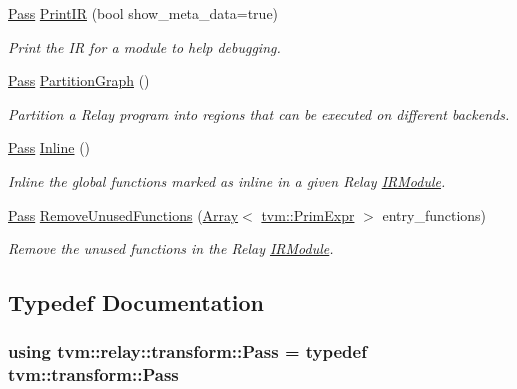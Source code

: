 \begin{DoxyCompactItemize}
\hyperlink{namespacetvm_1_1relay_1_1transform_afa666ade112e9955059095d695238a9a}{Pass} \hyperlink{namespacetvm_1_1relay_1_1transform_a065b5d8be6fd8dbfcef44dfa48adeb29}{Print\+IR} (bool show\+\_\+meta\+\_\+data=true)
\begin{DoxyCompactList}\small\item\em Print the IR for a module to help debugging. \end{DoxyCompactList}\item 
\hyperlink{namespacetvm_1_1relay_1_1transform_afa666ade112e9955059095d695238a9a}{Pass} \hyperlink{namespacetvm_1_1relay_1_1transform_aac0bfdaf6d09b360602243c81abe05a1}{Partition\+Graph} ()
\begin{DoxyCompactList}\small\item\em Partition a Relay program into regions that can be executed on different backends. \end{DoxyCompactList}\item 
\hyperlink{namespacetvm_1_1relay_1_1transform_afa666ade112e9955059095d695238a9a}{Pass} \hyperlink{namespacetvm_1_1relay_1_1transform_aba5e588279a3b19a119c9aa28c364bbe}{Inline} ()
\begin{DoxyCompactList}\small\item\em Inline the global functions marked as {\ttfamily inline} in a given Relay \hyperlink{classtvm_1_1IRModule}{I\+R\+Module}. \end{DoxyCompactList}\item 
\hyperlink{namespacetvm_1_1relay_1_1transform_afa666ade112e9955059095d695238a9a}{Pass} \hyperlink{namespacetvm_1_1relay_1_1transform_abdccee126a74a602e3669bdfaf0f259c}{Remove\+Unused\+Functions} (\hyperlink{classtvm_1_1Array}{Array}$<$ \hyperlink{classtvm_1_1PrimExpr}{tvm\+::\+Prim\+Expr} $>$ entry\+\_\+functions)
\begin{DoxyCompactList}\small\item\em Remove the unused functions in the Relay \hyperlink{classtvm_1_1IRModule}{I\+R\+Module}. \end{DoxyCompactList}\end{DoxyCompactItemize}


\subsection{Typedef Documentation}
\subsubsection[{\texorpdfstring{Pass}{Pass}}]{\setlength{\rightskip}{0pt plus 5cm}using {\bf tvm\+::relay\+::transform\+::\+Pass} = typedef {\bf tvm\+::transform\+::\+Pass}}\hypertarget{namespacetvm_1_1relay_1_1transform_afa666ade112e9955059095d695238a9a}{}\label{namespacetvm_1_1relay_1_1transform_afa666ade112e9955059095d695238a9a}
